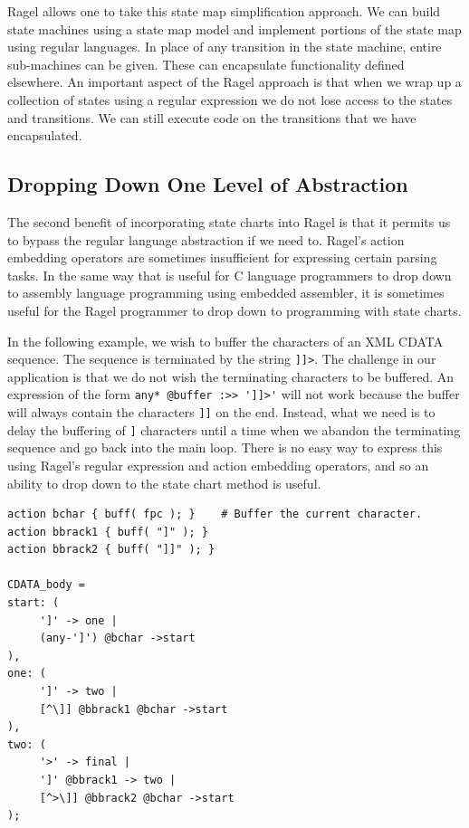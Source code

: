 \documentclass[letterpaper,11pt,oneside]{book}
\newenvironment{inline_code}{\def\baselinestretch{1}\vspace{12pt}\small}{}
\begin{document}
Ragel allows one to take this state map simplification approach. We can build
state machines using a state map model and implement portions of the state map
using regular languages. In place of any transition in the state machine,
entire sub-machines can be given. These can encapsulate functionality
defined elsewhere. An important aspect of the Ragel approach is that when we
wrap up a collection of states using a regular expression we do not lose
access to the states and transitions. We can still execute code on the
transitions that we have encapsulated.

\subsection{Dropping Down One Level of Abstraction}
\label{down}

The second benefit of incorporating state charts into Ragel is that it permits
us to bypass the regular language abstraction if we need to. Ragel's action
embedding operators are sometimes insufficient for expressing certain parsing
tasks.  In the same way that is useful for C language programmers to drop down
to assembly language programming using embedded assembler, it is sometimes
useful for the Ragel programmer to drop down to programming with state charts.

In the following example, we wish to buffer the characters of an XML CDATA
sequence. The sequence is terminated by the string \verb|]]>|. The challenge
in our application is that we do not wish the terminating characters to be
buffered. An expression of the form \verb|any* @buffer :>> ']]>'| will not work
because the buffer will always contain the characters \verb|]]| on the end.
Instead, what we need is to delay the buffering of \hspace{0.25mm} \verb|]|
characters until a time when we
abandon the terminating sequence and go back into the main loop. There is no
easy way to express this using Ragel's regular expression and action embedding
operators, and so an ability to drop down to the state chart method is useful.

\begin{inline_code}
\begin{verbatim}
action bchar { buff( fpc ); }    # Buffer the current character.
action bbrack1 { buff( "]" ); }
action bbrack2 { buff( "]]" ); }

CDATA_body =
start: (
     ']' -> one |
     (any-']') @bchar ->start
),
one: (
     ']' -> two |
     [^\]] @bbrack1 @bchar ->start
),
two: (
     '>' -> final |
     ']' @bbrack1 -> two |
     [^>\]] @bbrack2 @bchar ->start
);
\end{verbatim}
\end{inline_code}
\end{document}
